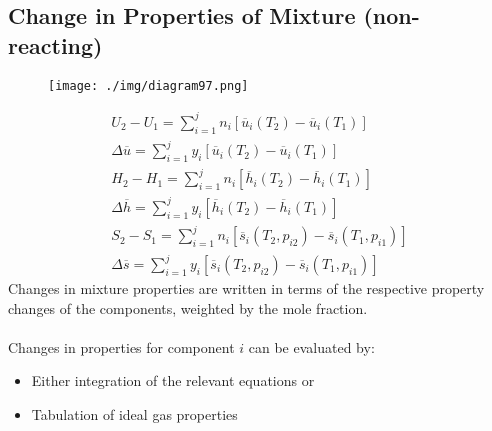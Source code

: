 \subsection{Change in Properties of Mixture (non-reacting)}
\begin{figure}[H]
  \centering
  \texttt{[image: ./img/diagram97.png]}
  \caption{}
\end{figure}
\begin{gather}
  U_2 - U_1 = \sum_{i=1}^{j}n_i\left[\overline{u}_i(T_2) - \overline{u}_i(T_1)\right] \\[5pt]
  \Delta\overline{u} = \sum_{i=1}^{j}y_i\left[\overline{u}_i(T_2) - \overline{u}_i(T_1)\right] \\[15pt]
  H_2 - H_1 = \sum_{i=1}^{j}n_i\left[\overline{h}_i(T_2) - \overline{h}_i(T_1)\right] \\[5pt]
  \Delta\overline{h} = \sum_{i=1}^{j}y_i\left[\overline{h}_i(T_2) - \overline{h}_i(T_1)\right] \\[15pt]
  S_2 - S_1 = \sum_{i=1}^{j}n_i\left[\overline{s}_i(T_2,p_{i2}) - \overline{s}_i(T_1,p_{i1})\right] \\[5pt]
  \Delta\overline{s} = \sum_{i=1}^{j}y_i\left[\overline{s}_i(T_2,p_{i2}) - \overline{s}_i(T_1,p_{i1})\right]
\end{gather}
Changes in mixture properties are written in terms of the respective property changes of the components, weighted by the mole fraction. \\\\
Changes in properties for component $i$ can be evaluated by:
\begin{itemize}[noitemsep]
  \item Either integration of the relevant equations or
  \item Tabulation of ideal gas properties
\end{itemize}
